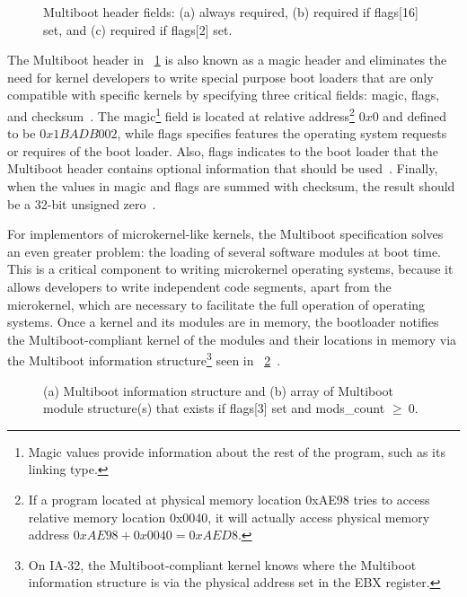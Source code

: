 	\begin{figure}[tb]
	\begin{center}
	\end{center}
	\caption{Multiboot header fields: (a) always required, (b) required if
	{\code flags[16]} set, and (c) required if {\code flags[2]} set.}
	\label{fig:multiboot_header}
	\end{figure}

The Multiboot header in \figurename~\ref{fig:multiboot_header} is also known as
a magic header and eliminates the
need for kernel developers to write special purpose boot loaders that
are only compatible with specific kernels by specifying three critical
fields: {\important magic}, {\important flags}, and
{\important checksum}~\cite{multiboot_info}.  The
{\important magic}\footnote{Magic values provide information about the rest of
the program, such as its linking type.}
field is located at relative
address\footnote{If a program located at physical memory location 0xAE98
tries to access relative memory location 0x0040, it will actually
access physical memory address \( 0xAE98+0x0040=0xAED8 \).}
$0x0$ and defined to be $0x1BADB002$, while {\important flags} specifies
features the operating system requests or requires of the boot loader.  Also,
{\important flags} indicates to the boot loader that the Multiboot
header contains optional information that should be used~\cite{multiboot_info}.
Finally, when the values in {\important magic} and {\important flags}
are summed with {\important checksum}, the result should be a
32-bit unsigned zero~\cite{multiboot_info}.

For implementors of microkernel-like kernels, the Multiboot specification
solves an even greater problem: the loading of several software modules at
boot time.  This is a critical component to writing microkernel operating
systems, because it allows developers to write independent code segments,
apart from the microkernel, which are necessary to facilitate the full
operation of operating systems.  Once a kernel and its modules are
in memory, the bootloader notifies the Multiboot-compliant kernel of the
modules and their locations in memory via the Multiboot information
structure\footnote{On IA-32, the Multiboot-compliant kernel knows where
the Multiboot information structure is via the physical address set
in the EBX register.}
seen in \figurename~\ref{fig:multiboot_info}~\cite{multiboot_info}.

	\begin{figure}[tb]
	\begin{center}
	\end{center}
	\caption{(a) Multiboot information structure and (b) array of
	Multiboot module structure(s) that exists if
	{\code flags[3]} set and {\code mods\_count} $\geq~0$.}
	\label{fig:multiboot_info}
	\end{figure}

